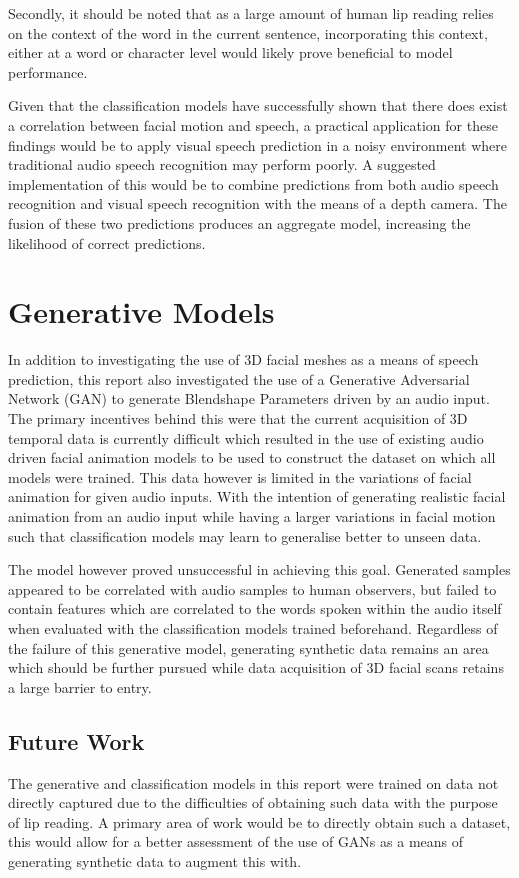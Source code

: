 Secondly, it should be noted that as a large amount of human lip reading relies on the context of the word in the current sentence, incorporating this context, either at a word or character level would likely prove beneficial to model performance.

Given that the classification models have successfully shown that there does exist a correlation between facial motion and speech, a practical application for these findings would be to apply visual speech prediction in a noisy environment where traditional audio speech recognition may perform poorly.
A suggested implementation of this would be to combine predictions from both audio speech recognition and visual speech recognition with the means of a depth camera.
The fusion of these two predictions produces an aggregate model, increasing the likelihood of correct predictions.

\section{Generative Models}
In addition to investigating the use of 3D facial meshes as a means of speech prediction, this report also investigated the use of a Generative Adversarial Network (GAN) to generate Blendshape Parameters driven by an audio input.
The primary incentives behind this were that the current acquisition of 3D temporal data is currently difficult which resulted in the use of existing audio driven facial animation models to be used to construct the dataset on which all models were trained.
This data however is limited in the variations of facial animation for given audio inputs.
With the intention of generating realistic facial animation from an audio input while having a larger variations in facial motion such that classification models may learn to generalise better to unseen data.

The model however proved unsuccessful in achieving this goal.
Generated samples appeared to be correlated with audio samples to human observers, but failed to contain features which are correlated to the words spoken within the audio itself when evaluated with the classification models trained beforehand.
Regardless of the failure of this generative model, generating synthetic data remains an area which should be further pursued while data acquisition of 3D facial scans retains a large barrier to entry.

\subsection{Future Work}
The generative and classification models in this report were trained on data not directly captured due to the difficulties of obtaining such data with the purpose of lip reading.
A primary area of work would be to directly obtain such a dataset, this would allow for a better assessment of the use of GANs as a means of generating synthetic data to augment this with.

